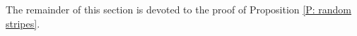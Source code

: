 \documentclass[10pt,a4paper]{amsart}
\begin{document}
The remainder of this section is devoted to the proof of Proposition \ref{P: random stripes}.

%
%	
%	
\end{document}
